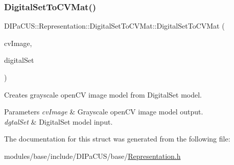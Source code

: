 \subsubsection{\texorpdfstring{Digital\+Set\+To\+C\+V\+Mat()}{DigitalSetToCVMat()}}
{\footnotesize\ttfamily D\+I\+Pa\+C\+U\+S\+::\+Representation\+::\+Digital\+Set\+To\+C\+V\+Mat\+::\+Digital\+Set\+To\+C\+V\+Mat (\begin{DoxyParamCaption}\item[{cv\+::\+Mat \&}]{cv\+Image,  }\item[{const \mbox{\hyperlink{structDIPaCUS_1_1Representation_1_1DigitalSetToCVMat_a476ca922b6635faab97aa112341663a9}{Digital\+Set}} \&}]{digital\+Set }\end{DoxyParamCaption})}



Creates grayscale open\+CV image model from Digital\+Set model. 


\begin{DoxyParams}{Parameters}
{\em cv\+Image} & Grayscale open\+CV image model output. \\
\hline
{\em dgtal\+Set} & Digital\+Set model input. \\
\hline
\end{DoxyParams}


The documentation for this struct was generated from the following file\+:\begin{DoxyCompactItemize}
\item 
modules/base/include/\+D\+I\+Pa\+C\+U\+S/base/\mbox{\hyperlink{Representation_8h}{Representation.\+h}}\end{DoxyCompactItemize}
